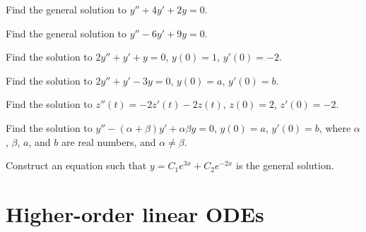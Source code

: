 \setcounter{exercise}{100}

\begin{exercise}
Find the general solution to
$y''+4y'+2y=0$.
\end{exercise}

\begin{exercise}
Find the general solution to
$y''-6y'+9y=0$.
\end{exercise}

\begin{exercise}
Find the solution to
$2y''+y'+y=0$, $y(0) = 1$, $y'(0)=-2$.
\end{exercise}

\begin{exercise}
Find the solution to
$2y''+y'-3y=0$, $y(0) = a$, $y'(0)=b$.
\end{exercise}

\begin{exercise}
Find the solution to
$z''(t) = -2z'(t)-2z(t)$, $z(0) = 2$, $z'(0)= -2$.
\end{exercise}

\begin{exercise}
Find the solution to
$y''-(\alpha+\beta) y' + \alpha \beta y=0$, $y(0) = a$, $y'(0)=b$,
where $\alpha$, $\beta$, $a$, and $b$ are real numbers,
and $\alpha \neq \beta$.
\end{exercise}

\begin{exercise}
Construct an equation such that $y = C_1 e^{3x} + C_2 e^{-2x}$ is the general
solution.
\end{exercise}


\sectionnewpage
\section{Higher-order linear ODEs} \label{sec:hol}


